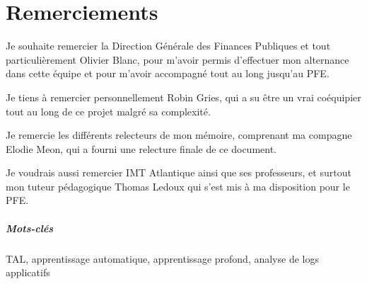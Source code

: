\documentclass[openany, 11pt]{memoir}
\newcommand\chapters[1]{
	\chapter*{#1}
	\addcontentsline{toc}{chapter}{#1}
}
\begin{document}
\newpage
\tableofcontents
{}

\newpage
\chapters{Remerciements}
Je souhaite remercier la Direction Générale des Finances Publiques et tout particulièrement Olivier Blanc, pour m'avoir permis d'effectuer mon alternance dans cette équipe et pour m'avoir accompagné tout au long jusqu'au PFE.

\bigskip
Je tiens à remercier personnellement Robin Gries, qui a su être un vrai coéquipier tout au long de ce projet malgré sa complexité.

\bigskip
Je remercie les différents relecteurs de mon mémoire, comprenant ma compagne Elodie Meon, qui a fourni une relecture finale de ce document.

\bigskip
Je voudrais aussi remercier IMT Atlantique ainsi que ses professeurs, et surtout mon tuteur pédagogique Thomas Ledoux qui s'est mis à ma disposition pour le PFE.

\newpage
\begin{abstract}
Les \glspl{log} sont une source importante de données détaillant le fonctionnement interne d'une application, mais ne sont pourtant que rarement utilisés a leur plein potentiel. Dans ce mémoire, je vais détailler le processus d'évolution d'un outil d'\gls{ml} qui utilise les logs pour détecter et même tenter de prévoir des anomalies logicielles. Un état de l'art des méthodes d'analyse de logs existante a été compilé, ainsi qu'une analyse des fichiers de logs disponibles. Ensuite, une implémentation des algorithmes a été faite à l'aide d'une réécriture de l'architecture du projet.
\end{abstract}

{ 
\begin{abstract}
\Glspl{log} are an important source of data when it comes to the internal workings of software, but they are rarely used to their full potential. In this memoir, I will explain the evolution of a machine learning tool which uses \glspl{log} to detect and even attempt to predict software anomalies. A state of the art of existing log analysis methods was compiled, as well as an analysis of available log files. Then, an implementation of the algorithms was made using a rewritten project architecture.
\end{abstract}}

\paragraph{Mots-clés}
\gls{TAL}, apprentissage automatique, apprentissage profond, analyse de logs applicatifs
\end{document}
